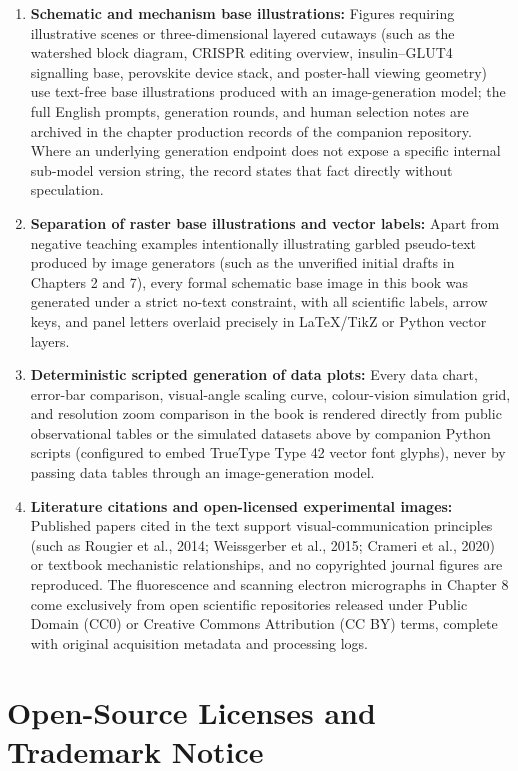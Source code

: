 \begin{enumerate}
  \item \textbf{Schematic and mechanism base illustrations:} Figures requiring illustrative scenes or three-dimensional layered cutaways (such as the watershed block diagram, CRISPR editing overview, insulin--GLUT4 signalling base, perovskite device stack, and poster-hall viewing geometry) use text-free base illustrations produced with an image-generation model; the full English prompts, generation rounds, and human selection notes are archived in the chapter production records of the companion repository. Where an underlying generation endpoint does not expose a specific internal sub-model version string, the record states that fact directly without speculation.
  \item \textbf{Separation of raster base illustrations and vector labels:} Apart from negative teaching examples intentionally illustrating garbled pseudo-text produced by image generators (such as the unverified initial drafts in Chapters 2 and 7), every formal schematic base image in this book was generated under a strict no-text constraint, with all scientific labels, arrow keys, and panel letters overlaid precisely in LaTeX/TikZ or Python vector layers.
  \item \textbf{Deterministic scripted generation of data plots:} Every data chart, error-bar comparison, visual-angle scaling curve, colour-vision simulation grid, and resolution zoom comparison in the book is rendered directly from public observational tables or the simulated datasets above by companion Python scripts (configured to embed TrueType Type 42 vector font glyphs), never by passing data tables through an image-generation model.
  \item \textbf{Literature citations and open-licensed experimental images:} Published papers cited in the text support visual-communication principles (such as Rougier et al., 2014; Weissgerber et al., 2015; Crameri et al., 2020) or textbook mechanistic relationships, and no copyrighted journal figures are reproduced. The fluorescence and scanning electron micrographs in Chapter 8 come exclusively from open scientific repositories released under Public Domain (CC0) or Creative Commons Attribution (CC BY) terms, complete with original acquisition metadata and processing logs.
\end{enumerate}

\section{Open-Source Licenses and Trademark Notice}

